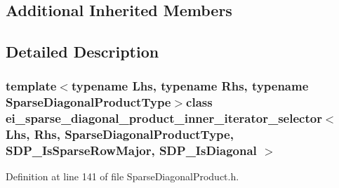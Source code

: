 \subsection*{Additional Inherited Members}


\subsection{Detailed Description}
\subsubsection*{template$<$typename Lhs, typename Rhs, typename Sparse\-Diagonal\-Product\-Type$>$class ei\-\_\-sparse\-\_\-diagonal\-\_\-product\-\_\-inner\-\_\-iterator\-\_\-selector$<$ Lhs, Rhs, Sparse\-Diagonal\-Product\-Type, S\-D\-P\-\_\-\-Is\-Sparse\-Row\-Major, S\-D\-P\-\_\-\-Is\-Diagonal $>$}



Definition at line 141 of file Sparse\-Diagonal\-Product.\-h.



